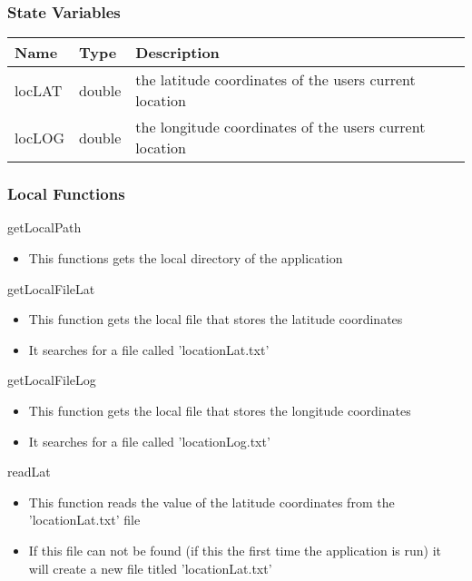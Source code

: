 \documentclass[12pt, titlepage]{article}
\begin{document}
\subsubsection{State Variables}

\begin{center}
\begin{tabular}{p{4cm} p{4cm} p{6cm}}
\hline
\textbf{Name} & \textbf{Type} & \textbf{Description} \\
\hline
locLAT & double & the latitude coordinates of the users current location \\
locLOG & double & the longitude coordinates of the users current location \\
\hline
\end{tabular}
\end{center}

\subsubsection{Local Functions}

\noindent getLocalPath
\begin{itemize}
\item This functions gets the local directory of the application
\end{itemize}

\noindent getLocalFileLat
\begin{itemize}
\item This function gets the local file that stores the latitude coordinates
\item It searches for a file called 'locationLat.txt'
\end{itemize}

\noindent getLocalFileLog
\begin{itemize}
\item This function gets the local file that stores the longitude coordinates
\item It searches for a file called 'locationLog.txt'
\end{itemize}

\noindent readLat
\begin{itemize}
\item This function reads the value of the latitude coordinates from the 'locationLat.txt' file
\item If this file can not be found (if this the first time the application is run) it will create a new file titled 'locationLat.txt'
\end{itemize}
\end{document}
